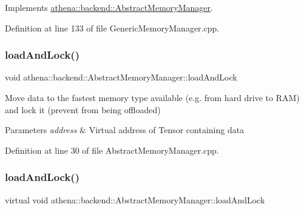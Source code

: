 Implements \mbox{\hyperlink{classathena_1_1backend_1_1_abstract_memory_manager_a9fe52e4020802d6f526fba06adce8407}{athena\+::backend\+::\+Abstract\+Memory\+Manager}}.



Definition at line 133 of file Generic\+Memory\+Manager.\+cpp.

\mbox{\label{classathena_1_1backend_1_1generic_1_1_generic_memory_manager_a47ea5a77f81f91f803f748720c5c19b5}} 
\subsubsection{\texorpdfstring{load\+And\+Lock()}{loadAndLock()}\hspace{0.1cm}{\footnotesize\ttfamily [2/4]}}
{\footnotesize\ttfamily void athena\+::backend\+::\+Abstract\+Memory\+Manager\+::load\+And\+Lock}

Move data to the fastest memory type available (e.\+g. from hard drive to R\+AM) and lock it (prevent from being offloaded) 
\begin{DoxyParams}{Parameters}
{\em address} & Virtual address of Tensor containing data \\
\hline
\end{DoxyParams}


Definition at line 30 of file Abstract\+Memory\+Manager.\+cpp.

\mbox{\label{classathena_1_1backend_1_1generic_1_1_generic_memory_manager_a9fe52e4020802d6f526fba06adce8407}} 
\subsubsection{\texorpdfstring{load\+And\+Lock()}{loadAndLock()}\hspace{0.1cm}{\footnotesize\ttfamily [3/4]}}
{\footnotesize\ttfamily virtual void athena\+::backend\+::\+Abstract\+Memory\+Manager\+::load\+And\+Lock}

